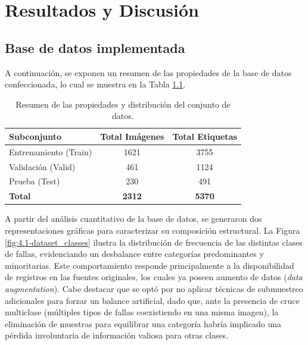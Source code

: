 \chapter{Resultados y Discusión}

\section{Base de datos implementada}

\par A continuación, se exponen un resumen de las propiedades de la base de datos confeccionada, lo cual se muestra en la Tabla \ref{tab:4.1-prop_dataset}.

\begin{table}[H]
    \centering
    \caption{Resumen de las propiedades y distribución del conjunto de datos.}
    \begin{tabular}{|l|c|c|}
        \hline
        \textbf{Subconjunto} & \textbf{Total Imágenes} & \textbf{Total Etiquetas} \\
        \hline
        Entrenamiento (Train) & 1621 & 3755 \\
        \hline
        Validación (Valid) & 461 & 1124 \\
        \hline
        Prueba (Test) & 230 & 491 \\
        \hline
        \textbf{Total} & \textbf{2312} & \textbf{5370} \\
        \hline
    \end{tabular}
    \label{tab:4.1-prop_dataset}
\end{table}

\par A partir del análisis cuantitativo de la base de datos, se generaron dos representaciones gráficas para caracterizar su composición estructural. La Figura \ref{fig:4.1-dataset_classes} ilustra la distribución de frecuencia de las distintas clases de fallas, evidenciando un desbalance entre categorías predominantes y minoritarias. Este comportamiento responde principalmente a la disponibilidad de registros en las fuentes originales, los cuales ya poseen aumento de datos (\textit{data augmentation}). Cabe destacar que se optó por no aplicar técnicas de submuestreo adicionales para forzar un balance artificial, dado que, ante la presencia de cruce multiclase (múltiples tipos de fallas coexistiendo en una misma imagen), la eliminación de muestras para equilibrar una categoría habría implicado una pérdida involuntaria de información valiosa para otras clases. \\

